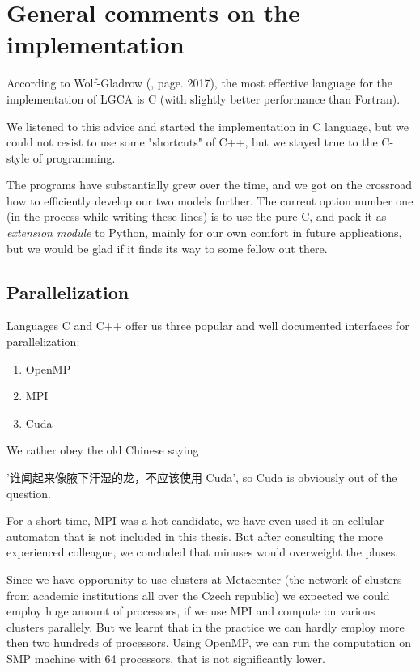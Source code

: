 \chapter{General comments on the implementation}

According to Wolf-Gladrow (\cite{wolf}, page. 2017), the most effective language for the implementation of LGCA is C (with slightly better performance than Fortran).

\bigskip

We listened to this advice and started the implementation in C language, but we could not resist to use some "shortcuts" of C++, but we stayed true to the C-style of programming.

\bigskip

The programs have substantially grew over the time, and we got on the crossroad how to efficiently develop our two models further. The current option number one (in the process while writing these lines) is to use the pure C, and pack it as \textit{extension module} to Python, mainly for our own comfort in future applications, but we would be glad if it finds its way to some fellow out there.

\section{Parallelization}
Languages C and C++ offer us three popular and well documented interfaces for parallelization:
\begin{enumerate}
\item OpenMP
\item MPI
\item Cuda
\end{enumerate}

We rather obey the old Chinese saying 
\begin{CJK*}{UTF8}{gbsn}
'谁闻起来像腋下汗湿的龙，不应该使用 Cuda', so Cuda is obviously out of the question.
\end{CJK*}

\bigskip

For a short time, MPI was a hot candidate, we have even used it on cellular automaton that is not included in this thesis. But after consulting the more experienced colleague, we concluded that minuses would overweight the pluses.

Since we have opporunity to use clusters at Metacenter (the network of clusters from academic institutions all over the Czech republic) we expected we could employ huge amount of processors, if we use MPI and compute on various clusters parallely. But we learnt that in the practice we can hardly employ more then two hundreds of processors.
Using OpenMP, we can run the computation on SMP machine with 64 processors, that is not significantly lower.

